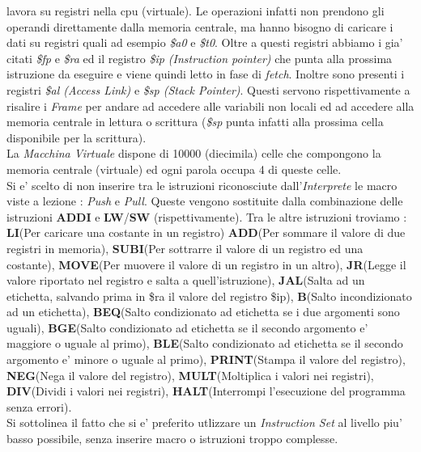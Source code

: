 \documentclass{article}
\begin{document}
\begin{enumerate}
    lavora su registri nella cpu (virtuale). Le operazioni infatti non prendono gli operandi direttamente dalla memoria centrale, ma hanno bisogno di caricare i dati su registri quali ad esempio \textit{\$a0} e \textit{\$t0}. Oltre a questi registri abbiamo i gia' citati \textit{\$fp} e \textit{\$ra} ed il registro \textit{\$ip (Instruction pointer)} che punta alla prossima istruzione da eseguire e viene quindi letto in fase di \textit{fetch}. Inoltre sono presenti i registri \textit{\$al (Access Link) } e \textit{\$sp (Stack Pointer)}. Questi servono rispettivamente a risalire i \textit{Frame} per andare ad accedere alle variabili non locali ed ad accedere alla memoria centrale in lettura o scrittura (\textit{\$sp} punta infatti alla prossima cella disponibile per la scrittura). \\
    La \textit{Macchina Virtuale} dispone di 10000 (diecimila) celle che compongono la memoria centrale (virtuale) ed ogni parola occupa 4 di queste celle.  \\
    Si e' scelto di non inserire tra le istruzioni riconosciute dall'\textit{Interprete} le macro viste a lezione : \textit{Push} e \textit{Pull}. Queste vengono sostituite dalla combinazione delle istruzioni \textbf{ADDI} e \textbf{LW}/\textbf{SW} (rispettivamente).
    Tra le altre istruzioni troviamo : \textbf{LI}(Per caricare una costante in un registro) 
    \textbf{ADD}(Per sommare il valore di due registri in memoria),
    \textbf{SUBI}(Per sottrarre il valore di un registro ed una costante),
    \textbf{MOVE}(Per muovere il valore di un registro in un altro),
    \textbf{JR}(Legge il valore riportato nel registro e salta a quell'istruzione),
    \textbf{JAL}(Salta ad un etichetta, salvando prima in \$ra il valore del registro \$ip),
    \textbf{B}(Salto incondizionato ad un etichetta),
    \textbf{BEQ}(Salto condizionato ad etichetta se i due argomenti sono uguali),
    \textbf{BGE}(Salto condizionato ad etichetta se il secondo argomento e' maggiore o uguale al primo),
    \textbf{BLE}(Salto condizionato ad etichetta se il secondo argomento e' minore o uguale al primo),
    \textbf{PRINT}(Stampa il valore del registro),
    \textbf{NEG}(Nega il valore del registro),
    \textbf{MULT}(Moltiplica i valori nei registri),
    \textbf{DIV}(Dividi i valori nei registri),
    \textbf{HALT}(Interrompi l'esecuzione del programma senza errori). \\
    Si sottolinea il fatto che si e' preferito utlizzare un \textit{Instruction Set} al livello piu' basso possibile, senza inserire macro o istruzioni troppo complesse.
\end{enumerate}
\end{document}
